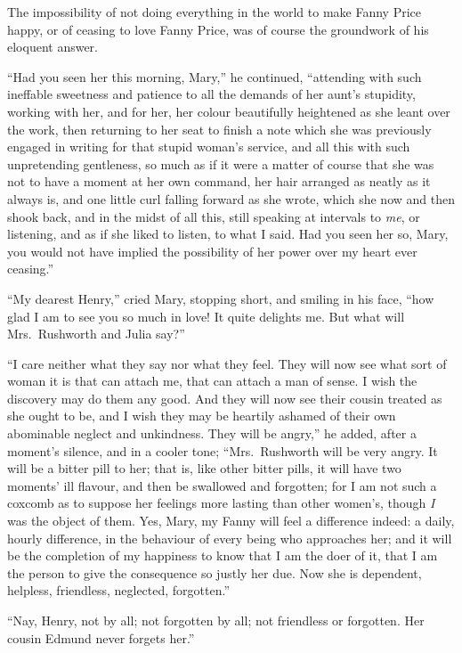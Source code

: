 The impossibility of not doing everything in the world to
make Fanny Price happy, or of ceasing to love Fanny Price,
was of course the groundwork of his eloquent answer.

``Had you seen her this morning, Mary,'' he continued,
``attending with such ineffable sweetness and patience to
all the demands of her aunt's stupidity, working with her,
and for her, her colour beautifully heightened as she
leant over the work, then returning to her seat to finish
a note which she was previously engaged in writing
for that stupid woman's service, and all this with such
unpretending gentleness, so much as if it were a matter
of course that she was not to have a moment at her
own command, her hair arranged as neatly as it always is,
and one little curl falling forward as she wrote, which she
now and then shook back, and in the midst of all this,
still speaking at intervals to \emph{me}, or listening,
and as if she liked to listen, to what I said.
Had you seen her so, Mary, you would not have implied
the possibility of her power over my heart ever ceasing.''

``My dearest Henry,'' cried Mary, stopping short, and smiling
in his face, ``how glad I am to see you so much in love!
It quite delights me.  But what will Mrs.\ Rushworth and
Julia say?''

``I care neither what they say nor what they feel.
They will now see what sort of woman it is that can attach me,
that can attach a man of sense.  I wish the discovery
may do them any good.  And they will now see their cousin
treated as she ought to be, and I wish they may be heartily
ashamed of their own abominable neglect and unkindness.
They will be angry,'' he added, after a moment's silence,
and in a cooler tone; ``Mrs.\ Rushworth will be very angry.
It will be a bitter pill to her; that is, like other
bitter pills, it will have two moments' ill flavour, and then
be swallowed and forgotten; for I am not such a coxcomb
as to suppose her feelings more lasting than other women's,
though \emph{I} was the object of them.  Yes, Mary, my Fanny
will feel a difference indeed:  a daily, hourly difference,
in the behaviour of every being who approaches her;
and it will be the completion of my happiness to know
that I am the doer of it, that I am the person to give
the consequence so justly her due.  Now she is dependent,
helpless, friendless, neglected, forgotten.''

``Nay, Henry, not by all; not forgotten by all; not friendless
or forgotten.  Her cousin Edmund never forgets her.''

